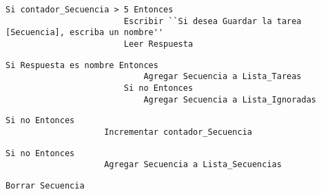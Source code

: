 \begin{table}[]
\begin{tiny}
\begin{lstlisting}[style=C]
                    Si contador_Secuencia > 5 Entonces
                        Escribir ``Si desea Guardar la tarea [Secuencia], escriba un nombre''
                        Leer Respuesta

\end{lstlisting}
\end{tiny}
\end{table}                        
                        
\begin{table}[]
\begin{tiny}
\begin{lstlisting}[style=C]  
                        Si Respuesta es nombre Entonces
                            Agregar Secuencia a Lista_Tareas
                        Si no Entonces 
                            Agregar Secuencia a Lista_Ignoradas

\end{lstlisting}
\end{tiny}
\end{table}


\begin{table}[]
\begin{tiny}
\begin{lstlisting}[style=C]
                    Si no Entonces
                    Incrementar contador_Secuencia

\end{lstlisting}
\end{tiny}
\end{table}
                    
                    
\begin{table}[]
\begin{tiny}
\begin{lstlisting}[style=C]
                Si no Entonces
                    Agregar Secuencia a Lista_Secuencias

\end{lstlisting}
\end{tiny}
\end{table}
            

\begin{table}[]
\begin{tiny}
\begin{lstlisting}[style=C]            
            Borrar Secuencia

\end{lstlisting}
\end{tiny}
\end{table}
            
